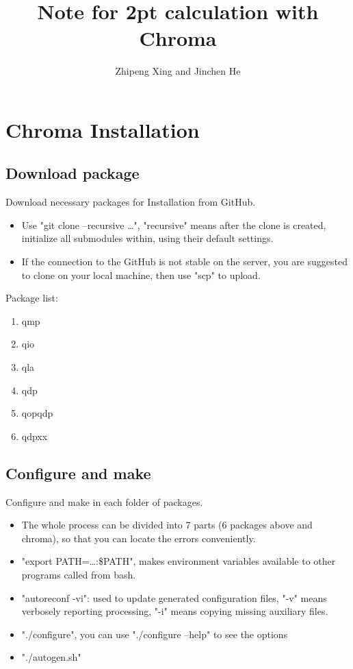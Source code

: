 \documentclass{article}
\title{Note for 2pt calculation with Chroma}
\author{Zhipeng Xing and Jinchen He}
\date{}
\begin{document}
\maketitle
\section{Chroma Installation}

\subsection{Download package}

Download necessary packages for Installation from GitHub.

\begin{itemize}
    \item Use "git clone --recursive \dots", "recursive" means after the clone is created, initialize all submodules within, using their default settings.
    \item If the connection to the GitHub is not stable on the server, you are suggested to clone on your local machine, then use "scp" to upload.
\end{itemize}

Package list:

\begin{enumerate}
    \item qmp
    \item qio
    \item qla
    \item qdp
    \item qopqdp
    \item qdpxx
\end{enumerate}

\subsection{Configure and make}

Configure and make in each folder of packages.

\begin{itemize}
    \item The whole process can be divided into 7 parts (6 packages above and chroma), so that you can locate the errors conveniently.
    \item "export PATH=\dots:\$PATH", makes environment variables available to other programs called from bash. 
    \item "autoreconf -vi": used to update generated configuration files, "-v" means verbosely reporting processing, "-i" means copying missing auxiliary files.
    \item "./configure", you can use "./configure –help" to see the options
    \item "./autogen.sh"
\end{itemize}
\end{document}
